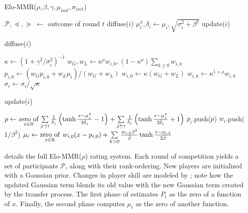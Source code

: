 \setlength{\floatsep}{0pt}
\setlength{\textfloatsep}{1em}
\begin{algorithm}[t]
\caption{Elo-MMR($\rho,\beta, \gamma, \mu_{init}, \sigma_{init}$)}
\label{alg:main}
\begin{algorithmic}
\STATE $\mathcal P, \preceq, \succeq\; \gets$ outcome of round $t$
\ENDIF
\STATE diffuse($i$)
\STATE $\mu^\pi_i, \delta_i \gets \mu_i,\sqrt{\sigma_i^2 + \beta^2}$
\ENDFOR
\STATE update($i$)
\ENDFOR
\ENDFOR
\end{algorithmic}
\end{algorithm}
\begin{algorithm}[t]
\caption{diffuse($i$)}
\label{alg:diffuse}
\begin{algorithmic}
\STATE $\kappa \gets (1+\gamma^2/\sigma_i^2)^{-1}$
\STATE $w_G, w_L \gets \kappa^\rho w_{i,0}, (1-\kappa^\rho) \sum_{k\geq 0} w_{i,k}$
\STATE $p_{i,0} \gets (w_G p_{i,0} + w_L \mu_i) / (w_G+w_L)$
\STATE $w_{i,0} \gets \kappa (w_G+w_L)$
\STATE $w_{i,k} \gets \kappa^{1+\rho}w_{i,k}$
\ENDFOR
\STATE $\sigma_i \gets \sigma_i / \sqrt\kappa$
\end{algorithmic}
\end{algorithm}
\begin{algorithm}[t]
\caption{update($i$)}
\label{alg:update}
\begin{algorithmic}
\STATE ${p \gets \mathop{\text{zero of}}\limits_{x \in {\mathbb R}} \, \sum\limits_{j\preceq i}\frac{1}{\delta_j}\left( \tanh\frac {x - \mu^\pi_j} {2\bar\delta_j} - 1 \right) + \sum\limits_{j\succeq i}\frac{1}{\delta_j}\left( \tanh\frac {x - \mu^\pi_j} {2\bar\delta_j} + 1 \right)}$
\STATE $p_i$.push($p$)
\STATE $w_i$.push($1/\beta^2$)
\STATE $\mu_i \gets \mathop{\text{zero of}}\limits_{x \in {\mathbb R}} \; w_{i,0}(x-p_{i,0}) + \sum\limits_{k>0} \frac{w_{i,k}\beta^2}{\bar\beta} \tanh \frac {x-p_{i,k}} {2\bar\beta}$
\end{algorithmic}
\end{algorithm}

 details the full Elo-MMR($\rho$) rating system. Each round of competition yields a set of participants $\mathcal P$, along with their rank-ordering. New players are initialized with a Gaussian prior. Changes in player skill are modeled by ; note how the updated Gaussian term blends its old value with the new Gaussian term created by the transfer process. The first phase of  estimates $P_t$ as the zero of a function of $x$. Finally, the second phase computes $\mu_t$ as the zero of another function. 

